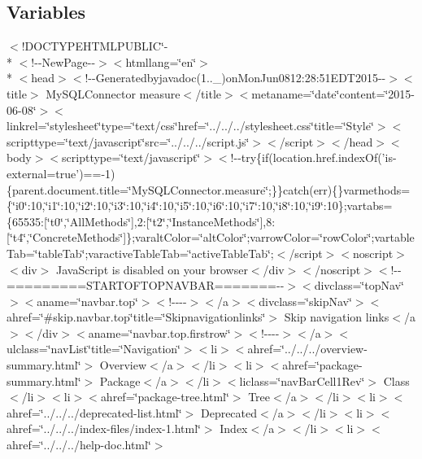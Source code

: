 \subsection*{Variables}
\begin{DoxyCompactItemize}
\item 
$<$!D\-O\-C\-T\-Y\-P\-E\-H\-T\-M\-L\-P\-U\-B\-L\-I\-C\char`\"{}-\/\\*
$<$!-\/-\/New\-Page-\/-\/$>$$<$htmllang=\char`\"{}en\char`\"{}$>$\\*
$<$head$>$$<$!-\/-\/Generatedbyjavadoc(1..\-\_)on\-Mon\-Jun0812\-:28\-:51\-E\-D\-T2015-\/-\/$>$$<$title$>$ My\-S\-Q\-L\-Connector measure$<$/title$>$$<$metaname=\char`\"{}date\char`\"{}content=\char`\"{}2015-\/06-\/08\char`\"{}$>$$<$linkrel=\char`\"{}stylesheet\char`\"{}type=\char`\"{}text/css\char`\"{}href=\char`\"{}../../../stylesheet.\-css\char`\"{}title=\char`\"{}\-Style\char`\"{}$>$$<$scripttype=\char`\"{}text/javascript\char`\"{}src=\char`\"{}../../../script.\-js\char`\"{}$>$$<$/script$>$$<$/head$>$$<$body$>$$<$scripttype=\char`\"{}text/javascript\char`\"{}$>$$<$!-\/-\/try\{if(location.\-href.\-index\-Of('is-\/external=true')==-\/1)\{parent.\-document.\-title=\char`\"{}\-My\-S\-Q\-L\-Connector.\-measure\char`\"{};\}\}catch(err)\{\}varmethods=\{\char`\"{}i0\char`\"{}\-:10,\char`\"{}i1\char`\"{}\-:10,\char`\"{}i2\char`\"{}\-:10,\char`\"{}i3\char`\"{}\-:10,\char`\"{}i4\char`\"{}\-:10,\char`\"{}i5\char`\"{}\-:10,\char`\"{}i6\char`\"{}\-:10,\char`\"{}i7\char`\"{}\-:10,\char`\"{}i8\char`\"{}\-:10,\char`\"{}i9\char`\"{}\-:10\};vartabs=\{65535\-:\mbox{[}\char`\"{}t0\char`\"{},\char`\"{}\-All\-Methods\char`\"{}\mbox{]},2\-:\mbox{[}\char`\"{}t2\char`\"{},\char`\"{}\-Instance\-Methods\char`\"{}\mbox{]},8\-:\mbox{[}\char`\"{}t4\char`\"{},\char`\"{}\-Concrete\-Methods\char`\"{}\mbox{]}\};varalt\-Color=\char`\"{}alt\-Color\char`\"{};varrow\-Color=\char`\"{}row\-Color\char`\"{};vartable\-Tab=\char`\"{}table\-Tab\char`\"{};varactive\-Table\-Tab=\char`\"{}active\-Table\-Tab\char`\"{};$<$/script$>$$<$noscript$>$$<$div$>$ Java\-Script is disabled on your browser$<$/div$>$$<$/noscript$>$$<$!-\/-\/=========\-S\-T\-A\-R\-T\-O\-F\-T\-O\-P\-N\-A\-V\-B\-A\-R=======-\/-\/$>$$<$divclass=\char`\"{}top\-Nav\char`\"{}$>$$<$aname=\char`\"{}navbar.\-top\char`\"{}$>$$<$!-\/-\/-\/-\/$>$$<$/a$>$$<$divclass=\char`\"{}skip\-Nav\char`\"{}$>$$<$ahref=\char`\"{}\#skip.\-navbar.\-top\char`\"{}title=\char`\"{}\-Skipnavigationlinks\char`\"{}$>$ Skip navigation links$<$/a$>$$<$/div$>$$<$aname=\char`\"{}navbar.\-top.\-firstrow\char`\"{}$>$$<$!-\/-\/-\/-\/$>$$<$/a$>$$<$ulclass=\char`\"{}nav\-List\char`\"{}title=\char`\"{}\-Navigation\char`\"{}$>$$<$li$>$$<$ahref=\char`\"{}../../../overview-\/summary.\-html\char`\"{}$>$ Overview$<$/a$>$$<$/li$>$$<$li$>$$<$ahref=\char`\"{}package-\/summary.\-html\char`\"{}$>$ Package$<$/a$>$$<$/li$>$$<$liclass=\char`\"{}nav\-Bar\-Cell1\-Rev\char`\"{}$>$ Class$<$/li$>$$<$li$>$$<$ahref=\char`\"{}package-\/tree.\-html\char`\"{}$>$ Tree$<$/a$>$$<$/li$>$$<$li$>$$<$ahref=\char`\"{}../../../deprecated-\/list.\-html\char`\"{}$>$ Deprecated$<$/a$>$$<$/li$>$$<$li$>$$<$ahref=\char`\"{}../../../index-\/files/index-\/1.\-html\char`\"{}$>$ Index$<$/a$>$$<$/li$>$$<$li$>$$<$ahref=\char`\"{}../../../help-\/doc.\-html\char`\"{}$>$ $$
\end{DoxyCompactItemize}
